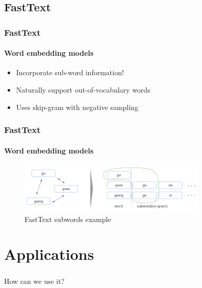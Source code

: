 

\subsection{FastText}


\begin{frame}
\frametitle{FastText}
	\framesubtitle{Word embedding models}

	\begin{itemize}
		\item Incorporate sub-word information!
		\item Naturally support out-of-vocabulary words
		\item Uses skip-gram with negative sampling
	\end{itemize}

\end{frame}

\begin{frame}
\frametitle{FastText}
	\framesubtitle{Word embedding models}

	\begin{figure}
		\includegraphics[width=9cm]{./figures/fasttext}
		\caption{FastText subwords example}
	\end{figure}

\end{frame}


\section{Applications}


\begin{frame}
\frametitle{}

\begin{center}
	\Huge {How can we use it?}
\end{center}
\end{frame}

